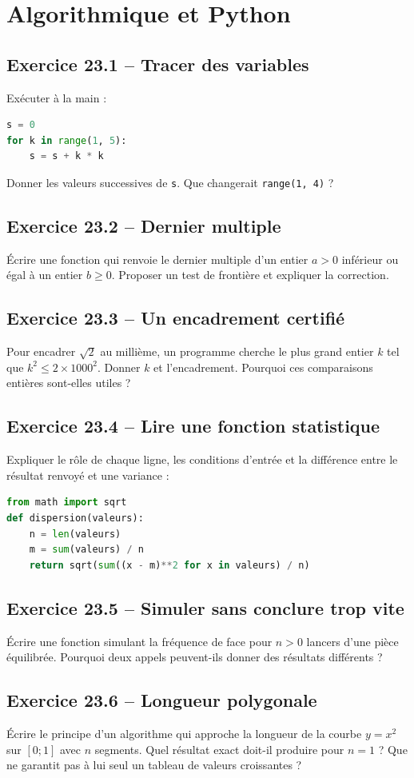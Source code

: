 \chapter{Algorithmique et Python}
\section*{Exercice 23.1 -- Tracer des variables}
Exécuter à la main : \begin{lstlisting}[language=Python]
s = 0
for k in range(1, 5):
    s = s + k * k
\end{lstlisting}
Donner les valeurs successives de \texttt{s}. Que changerait \texttt{range(1, 4)} ?

\section*{Exercice 23.2 -- Dernier multiple}
Écrire une fonction qui renvoie le dernier multiple d'un entier $a>0$ inférieur ou égal à un entier $b\ge0$. Proposer un test de frontière et expliquer la correction.

\section*{Exercice 23.3 -- Un encadrement certifié}
Pour encadrer $\sqrt2$ au millième, un programme cherche le plus grand entier $k$ tel que $k^2\le2\times1000^2$. Donner $k$ et l'encadrement. Pourquoi ces comparaisons entières sont-elles utiles ?

\section*{Exercice 23.4 -- Lire une fonction statistique}
Expliquer le rôle de chaque ligne, les conditions d'entrée et la différence entre le résultat renvoyé et une variance :\begin{lstlisting}[language=Python]
from math import sqrt
def dispersion(valeurs):
    n = len(valeurs)
    m = sum(valeurs) / n
    return sqrt(sum((x - m)**2 for x in valeurs) / n)
\end{lstlisting}

\section*{Exercice 23.5 -- Simuler sans conclure trop vite}
Écrire une fonction simulant la fréquence de face pour $n>0$ lancers d'une pièce équilibrée. Pourquoi deux appels peuvent-ils donner des résultats différents ?

\section*{Exercice 23.6 -- Longueur polygonale}
Écrire le principe d'un algorithme qui approche la longueur de la courbe $y=x^2$ sur $[0;1]$ avec $n$ segments. Quel résultat exact doit-il produire pour $n=1$ ? Que ne garantit pas à lui seul un tableau de valeurs croissantes ?
